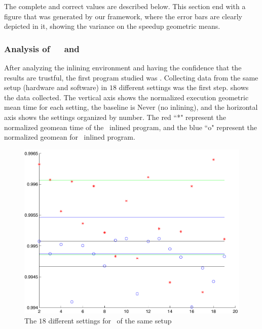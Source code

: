 The complete and correct values are described below. This section end with a figure that was generated by our framework, where the error bars are clearly depicted in it, showing the variance on the speedup geometric means.

\subsubsection{Analysis of\ \ \bzip\  and  \gzip}

After analyzing the inlining environment and having the confidence that the results are trustful, the first program studied was \bzip. 
Collecting data from the same setup (hardware and software) in $18$ different settings was the first step.  shows the data collected. The vertical axis shows the normalized execution geometric mean time for each setting, the baseline is Never (no inlining), and the horizontal axis shows the settings organized by number. The red ``*" represent the normalized geomean time of the \FDI\ inlined program, and the blue ``o" represent the normalized geomean for \llvm\ inlined program.

\begin{figure}
  \centering
  \includegraphics[width=1.00\linewidth]{Figures/fdllrep}
  \caption{The $18$ different settings for \bzip\ of the same setup}
  \label{fig:fdllrep}
\end{figure}

